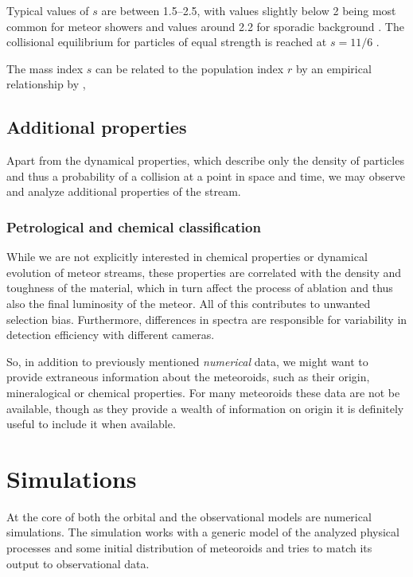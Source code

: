             Typical values of $s$ are between \numrange{1.5}{2.5}, with values slightly below 2 being most common
            for meteor showers and values around \num{2.2} for sporadic background \citep{blaauw+2011}.
            The collisional equilibrium for particles of equal strength is reached at $s = 11/6$ \citep{dohnanyi1969}.

            The mass index $s$ can be related to the population index $r$ by an empirical relationship by \citet{koschack+1990},

    \subsection{Additional properties} \label{moa}
        Apart from the dynamical properties, which describe only the density of particles
        and thus a probability of a collision at a point in space and time,
        we may observe and analyze additional properties of the stream.

        \subsubsection{Petrological and chemical classification} \label{moac}
            While we are not explicitly interested in chemical properties
            or dynamical evolution of meteor streams, these properties
            are correlated with the density and toughness of the material,
            which in turn affect the process of ablation
            and thus also the final luminosity of the meteor.
            All of this contributes to unwanted selection bias.
            Furthermore, differences in spectra are responsible for
            variability in detection efficiency with different cameras.

            So, in addition to previously mentioned \textit{numerical} data, we might want to
            provide extraneous information about the meteoroids, such as their origin,
            mineralogical or chemical properties.
            For many meteoroids these data are not be available,
            though as they provide a wealth of information on origin
            it is definitely useful to include it when available.


\section{Simulations} \label{mi}
    At the core of both the orbital and the observational models are numerical simulations.
    The simulation works with a generic model of the analyzed physical processes and some initial
    distribution of meteoroids and tries to match its output to observational data.

